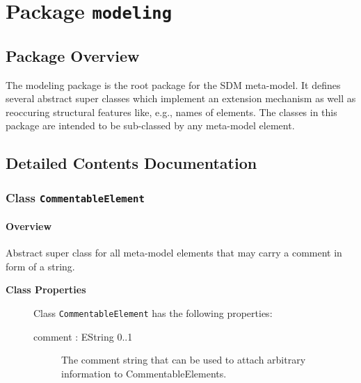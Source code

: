 \section{Package \bfseries \texttt{modeling}\normalfont}
\subsection{Package Overview}
	
			
The modeling package is the root package for the SDM meta-model. It defines several abstract super classes which implement an extension mechanism as well as reoccuring structural features like, e.g., names of elements. The classes in this package are intended to be sub-classed by any meta-model element.	
		
	
			
		



\subsection{Detailed Contents Documentation}
\subsubsection{\Large{Class \bfseries \texttt{CommentableElement}\normalfont}}
\label{cls:modeling::CommentableElement} 
\paragraph{Overview}

	
			
Abstract super class for all meta-model elements that may carry a comment in form of a string.	
		
	


\begin{description}

	\item[\textbf{Class Properties}] Class \texttt{CommentableElement} has the following properties:
	\begin{description}
\item[comment : EString 			0..1]

\hspace{\fill}
\nopagebreak


	
			
The comment string that can be used to attach arbitrary information to CommentableElements.	
		
	
	\end{description}
	
	

\end{description}

